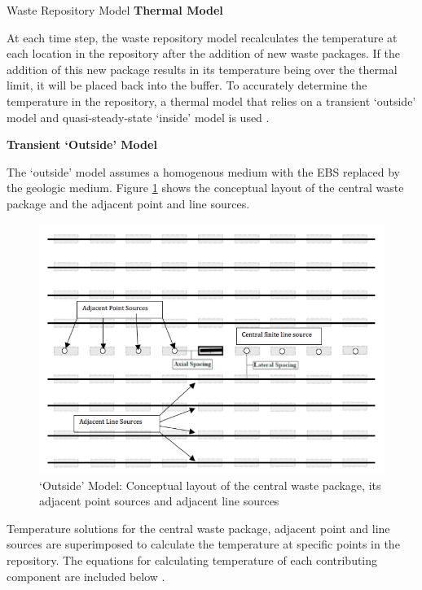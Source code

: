 \documentclass[final]{beamer}
\newlength{\onecolwid}
\newlength{\threecolwid}
\begin{document}
\begin{frame}[t]
\begin{columns}[t,totalwidth=\threecolwid]
\begin{column}{\onecolwid}
\begin{block}{Waste Repository Model}
\vspace{0.7em}
\textbf{Thermal Model}

At each time step, the waste repository model recalculates the temperature at each 
location in the repository after the addition of new waste packages. 
If the addition of this new package results in its temperature being over the thermal 
limit, it will be placed back into the buffer.  
To accurately determine the temperature in the repository, a thermal model that 
relies on a transient `outside' model and quasi-steady-state `inside' model is used
\cite{sutton_investigations_2011}. 

\vspace{0.7em}
\textbf{Transient `Outside' Model}

The `outside' model assumes a homogenous medium with the \gls{EBS} replaced by the 
geologic medium. 
Figure \ref{fig:conceptual_layout} shows the conceptual layout of the central waste 
package and the adjacent point and line sources. 

\begin{figure}
	\label{fig:conceptual_layout}
	\includegraphics[width=1\linewidth]{outsidemodel}
	\caption{`Outside' Model: Conceptual layout of the central waste package, its adjacent
	point sources and adjacent line sources \cite{sutton_investigations_2011}}
\end{figure}

Temperature solutions for the central waste package, adjacent point and line sources 
are superimposed to calculate the temperature at specific points in the repository.
The equations for calculating temperature of each contributing component 
are included below \cite{sutton_investigations_2011,greenberg_application_2012,huff_numerical_2012}. 


\end{block}
\end{column}
\end{columns}
\end{frame}
\end{document}

